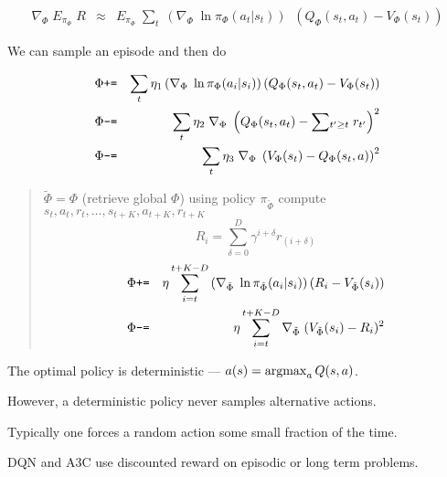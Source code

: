 {
\begin{eqnarray*}
  \nabla_\Phi \;E_{\pi_\Phi}\;R   & \approx & E_{\pi_\Phi} \; \sum_t\; \left(\nabla_\Phi \;\ln \pi_\Phi(a_t|s_t)\right) \;\;(Q_\Phi(s_t,a_t) - V_\Phi(s_t))
\end{eqnarray*}

We can sample an episode and then do

\begin{eqnarray*}
  \Phi  &\mbox{\tt +=} & \sum_t \eta_1\left(\nabla_{\Phi}\;\ln \pi_{\Phi}(a_i|s_i)\right)(Q_\Phi(s_t,a_t) - V_\Phi(s_t))\\
  \Phi & \mbox{\tt -=} & \sum_t \eta_2 \;\nabla_{\Phi}\;\left(Q_\Phi(s_t,a_t) - \sum \!_{t' \geq t}\; r_{t'}\right)^2 \\
  \Phi & \mbox{\tt -=} & \sum_t \eta_3 \;\nabla_{\Phi}\;\left(V_\Phi(s_t) - Q_\Phi(s_t,a)\right)^2 \\
\end{eqnarray*}



\begin{quotation}
  \noindent $\tilde{\Phi} = \Phi$ (retrieve global $\Phi$)\newline
  \noindent using policy $\pi_{\tilde{\Phi}}$ compute $s_t,a_t,r_t,\ldots,s_{t+K},a_{t+K},r_{t+K}$
  $$R_i = \sum_{\delta=0}^D \gamma^{i+\delta} r_{(i+\delta)}$$
  \begin{eqnarray*}
  \Phi  &\mbox{\tt +=} & \eta \sum_{i=t}^{t+K-D} \left(\nabla_{\tilde{\Phi}}\;\ln \pi_{\tilde{\Phi}}(a_i|s_i)\right)\left(R_i - V_{\tilde{\Phi}}(s_i)\right)\\
  \Phi & \mbox{\tt -=} & \eta \sum_{i=t}^{t+K-D} \nabla_{\tilde{\Phi}}\;(V_{\tilde{\Phi}}(s_i) - R_i)^2
  \end{eqnarray*}
\end{quotation}


The optimal policy is deterministic --- $a(s) = \operatorname*{argmax}_a Q(s,a)$.

\vfill
However, a deterministic policy never samples alternative actions.

\vfill
Typically one forces a random action some small fraction of the time.



DQN and A3C use discounted reward on episodic or long term problems.

}
